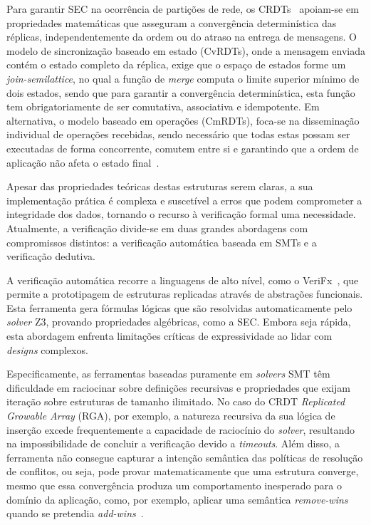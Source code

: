 \documentclass{llncs}
\begin{document}
Para garantir SEC na ocorrência de partições de rede, os CRDTs~\cite{preguica2018overview} apoiam-se em propriedades matemáticas que asseguram a convergência determinística das réplicas,
independentemente da ordem ou do atraso na entrega de mensagens. O modelo de sincronização baseado em estado (CvRDTs),
onde a mensagem enviada contém o estado completo da réplica, exige que o espaço de estados forme um \textit{join-semilattice},
no qual a função de \textit{merge} computa o limite superior mínimo de dois estados, sendo que para garantir a convergência determinística,
esta função tem obrigatoriamente de ser comutativa, associativa e idempotente. Em alternativa, o modelo baseado em operações (CmRDTs),
foca-se na disseminação individual de operações recebidas, sendo necessário que todas estas possam ser executadas de forma concorrente,
comutem entre si e garantindo que a ordem de aplicação não afeta o estado final~\cite{shapiro2011comprehensive}.

Apesar das propriedades teóricas destas estruturas serem claras, a sua implementação prática é complexa e suscetível a erros que podem comprometer a integridade dos dados,
tornando o recurso à verificação formal uma necessidade. Atualmente, a verificação divide-se em duas grandes abordagens com compromissos distintos:
a verificação automática baseada em SMTs e a verificação dedutiva.

A verificação automática recorre a linguagens de alto nível, como o VeriFx~\cite{porre2023masses}, que permite a prototipagem de estruturas replicadas através de abstrações funcionais.
Esta ferramenta gera fórmulas lógicas que são resolvidas automaticamente pelo \textit{solver} Z3, provando propriedades algébricas,
como a SEC. Embora seja rápida, esta abordagem enfrenta limitações críticas de expressividade ao lidar com \textit{designs} complexos.

Especificamente, as ferramentas baseadas puramente em \textit{solvers} SMT têm dificuldade em raciocinar sobre definições recursivas e propriedades que exijam iteração sobre estruturas de tamanho ilimitado.
No caso do CRDT \textit{Replicated Growable Array} (RGA), por exemplo, a natureza recursiva da sua lógica de inserção excede frequentemente a capacidade de raciocínio do \textit{solver},
resultando na impossibilidade de concluir a verificação devido a \textit{timeouts}. Além disso, a ferramenta não consegue capturar a intenção semântica das políticas de resolução de conflitos,
ou seja, pode provar matematicamente que uma estrutura converge, mesmo que essa convergência produza um comportamento inesperado para o domínio da aplicação, como,
por exemplo, aplicar uma semântica \textit{remove-wins} quando se pretendia \textit{add-wins}~\cite{dina2022thesis}.
\end{document}
